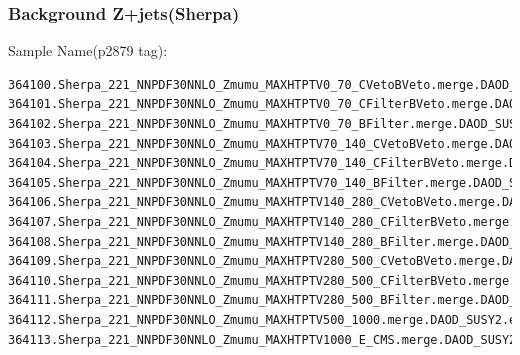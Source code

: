 \documentclass[mathserif,serif]{beamer}
\begin{document}
\begin{frame}[fragile]
\frametitle{Background Z+jets(Sherpa)}
\small
Sample Name(p2879 tag):
\tiny
\begin{verbatim}
364100.Sherpa_221_NNPDF30NNLO_Zmumu_MAXHTPTV0_70_CVetoBVeto.merge.DAOD_SUSY2.e5271_s2726_r7772_r7676_p2879
364101.Sherpa_221_NNPDF30NNLO_Zmumu_MAXHTPTV0_70_CFilterBVeto.merge.DAOD_SUSY2.e5271_s2726_r7772_r7676_p2879
364102.Sherpa_221_NNPDF30NNLO_Zmumu_MAXHTPTV0_70_BFilter.merge.DAOD_SUSY2.e5271_s2726_r7772_r7676_p2879
364103.Sherpa_221_NNPDF30NNLO_Zmumu_MAXHTPTV70_140_CVetoBVeto.merge.DAOD_SUSY2.e5271_s2726_r7772_r7676_p2879
364104.Sherpa_221_NNPDF30NNLO_Zmumu_MAXHTPTV70_140_CFilterBVeto.merge.DAOD_SUSY2.e5271_s2726_r7772_r7676_p2879
364105.Sherpa_221_NNPDF30NNLO_Zmumu_MAXHTPTV70_140_BFilter.merge.DAOD_SUSY2.e5271_s2726_r7772_r7676_p2879
364106.Sherpa_221_NNPDF30NNLO_Zmumu_MAXHTPTV140_280_CVetoBVeto.merge.DAOD_SUSY2.e5271_s2726_r7772_r7676_p2879
364107.Sherpa_221_NNPDF30NNLO_Zmumu_MAXHTPTV140_280_CFilterBVeto.merge.DAOD_SUSY2.e5271_s2726_r7772_r7676_p2879
364108.Sherpa_221_NNPDF30NNLO_Zmumu_MAXHTPTV140_280_BFilter.merge.DAOD_SUSY2.e5271_s2726_r7772_r7676_p2879
364109.Sherpa_221_NNPDF30NNLO_Zmumu_MAXHTPTV280_500_CVetoBVeto.merge.DAOD_SUSY2.e5271_s2726_r7772_r7676_p2879
364110.Sherpa_221_NNPDF30NNLO_Zmumu_MAXHTPTV280_500_CFilterBVeto.merge.DAOD_SUSY2.e5271_s2726_r7772_r7676_p2879
364111.Sherpa_221_NNPDF30NNLO_Zmumu_MAXHTPTV280_500_BFilter.merge.DAOD_SUSY2.e5271_s2726_r7772_r7676_p2879
364112.Sherpa_221_NNPDF30NNLO_Zmumu_MAXHTPTV500_1000.merge.DAOD_SUSY2.e5271_s2726_r7772_r7676_p2879
364113.Sherpa_221_NNPDF30NNLO_Zmumu_MAXHTPTV1000_E_CMS.merge.DAOD_SUSY2.e5271_s2726_r7772_r7676_p2879
\end{verbatim}
\end{frame}
\end{document}
